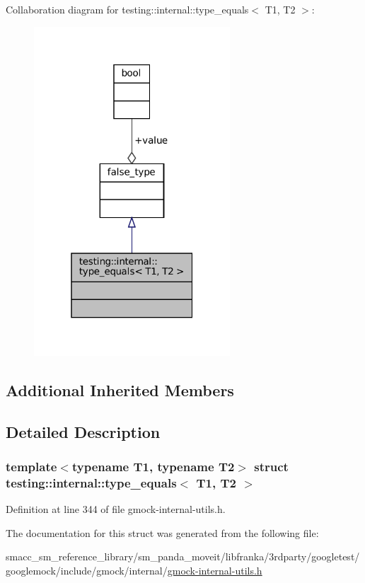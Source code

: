 Collaboration diagram for testing\+:\+:internal\+:\+:type\+\_\+equals$<$ T1, T2 $>$\+:
\nopagebreak
\begin{figure}[H]
\begin{center}
\leavevmode
\includegraphics[width=208pt]{structtesting_1_1internal_1_1type__equals__coll__graph}
\end{center}
\end{figure}
\subsection*{Additional Inherited Members}


\subsection{Detailed Description}
\subsubsection*{template$<$typename T1, typename T2$>$\newline
struct testing\+::internal\+::type\+\_\+equals$<$ T1, T2 $>$}



Definition at line 344 of file gmock-\/internal-\/utils.\+h.



The documentation for this struct was generated from the following file\+:\begin{DoxyCompactItemize}
\item 
smacc\+\_\+sm\+\_\+reference\+\_\+library/sm\+\_\+panda\+\_\+moveit/libfranka/3rdparty/googletest/googlemock/include/gmock/internal/\hyperlink{gmock-internal-utils_8h}{gmock-\/internal-\/utils.\+h}\end{DoxyCompactItemize}
